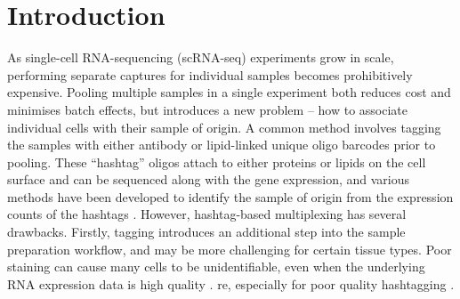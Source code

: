 \documentclass[unnumsec,webpdf,modern,large]{oup-authoring-template}
\begin{document}
	
		\maketitle

		\section{Introduction}
	\label{sec:introduction}
	
	As single-cell RNA-sequencing (scRNA-seq) experiments grow in scale, performing separate captures for individual samples becomes prohibitively expensive. 
	Pooling multiple samples in a single experiment both reduces cost and minimises batch effects, but introduces a new problem – how to associate individual cells with their sample of origin. 
	A common method involves tagging the samples with either antibody or lipid-linked unique oligo barcodes prior to pooling. 
	These ``hashtag'' oligos attach to either proteins
	\citep{Stoeckius2018} 
	or lipids \citep{McGinnis2019}
	on the cell surface and can be sequenced along with the gene expression, and various methods have been developed to identify the sample of origin from the expression counts of the hashtags 
	\citep{Howitt2023}.
	However, hashtag-based multiplexing has several drawbacks. 
	Firstly, tagging introduces an additional step into the sample preparation workflow, and may be more challenging for certain tissue types. 
	Poor staining can cause many cells to be unidentifiable, even when the underlying RNA expression data is high quality 
	\citep{Brown2024}. 
re, especially for poor quality hashtagging 
	\citep{Howitt2023}.
	
\end{document}
